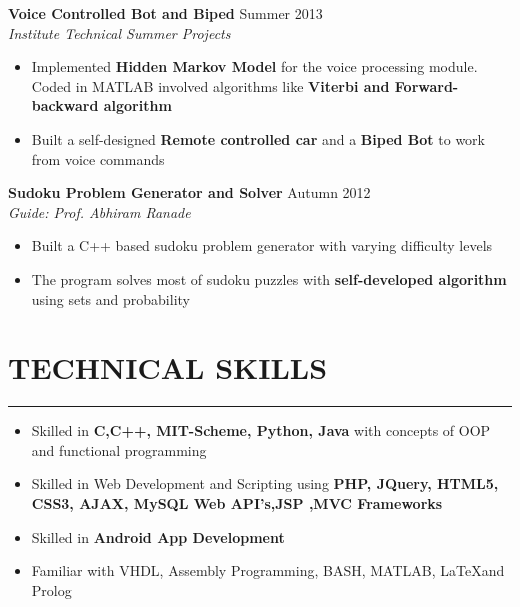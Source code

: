 \documentclass[11pt]{article} %
\begin{document}
\noindent \textbf{Voice Controlled Bot and Biped} \hfill Summer 2013 \vspace{-0.5mm}\\
\textit{Institute Technical Summer Projects}
\vspace{-4mm}
\begin{itemize}
\itemsep-0.4em
\item Implemented \textbf{Hidden Markov Model} for the voice processing module. Coded in MATLAB involved algorithms like \textbf{Viterbi and Forward-backward algorithm}
\item Built a self-designed \textbf{Remote controlled car} and a \textbf{Biped Bot} to work from voice commands
\end{itemize}
\vspace{-3mm}

\noindent \textbf{Sudoku Problem Generator and Solver} \hfill Autumn 2012 \vspace{-0.5mm}\\
\textit{Guide: Prof. Abhiram Ranade}
\vspace{-4mm}
\begin{itemize}
\itemsep-0.4em
\item Built a C++ based sudoku problem generator with varying difficulty levels
\item The program solves most of sudoku puzzles with \textbf{self-developed algorithm} using sets and probability
\end{itemize}







\vspace{-8mm}
\section*{TECHNICAL SKILLS}
\vspace{-3mm}
\hrule
\medskip
\begin{itemize}
\itemsep-0.4em
\item Skilled in \textbf{C,C++, MIT-Scheme, Python, Java} with concepts of OOP and functional programming
\item Skilled in Web Development and Scripting using \textbf{PHP, JQuery,  HTML5, CSS3, AJAX, MySQL Web API’s,JSP ,MVC Frameworks}
\item Skilled in \textbf{Android App Development}
\item Familiar with {VHDL, Assembly Programming, BASH, MATLAB,  \LaTeX  and Prolog}
\end{itemize}
\vspace{-8mm}
\end{document}
